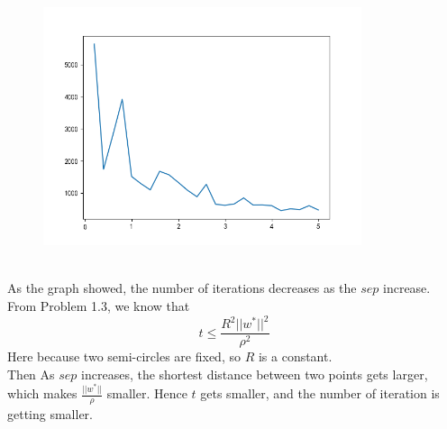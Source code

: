\documentclass[11pt]{article}
\begin{document}
\\
\begin{figure}[htb]
	{\includegraphics[height=7cm]{p3_2.png}}
\end{figure}\\
As the graph showed, the number of iterations decreases as the $sep$ increase.\\
From Problem 1.3, we know that\[
	t \leq \frac{R^2||w^*||^2}{\rho^2}
\] Here because two semi-circles are fixed, so $R$ is a constant.\\
Then As $sep$ increases, the shortest distance between two points gets larger, which makes $\frac{||w^*||}{\rho}$ smaller. Hence $t$ gets smaller, and the number of iteration is getting smaller.

\newpage
\end{document}
